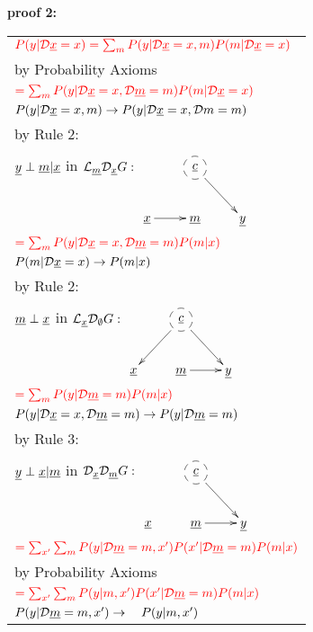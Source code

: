 {\bf * proof 2:}
\begin{longtable}{l}
$\color{red}
P(y|{\cal D}{\underline{x}}=x)=
\sum_m
P(y|{\cal D}{\underline{x}}=x, m)
P(m|{\cal D}{\underline{x}}=x)$
\\
\quad by Probability Axioms
\\
$\color{red}=
\sum_m
P(y|{\cal D}{\underline{x}}=x, {\cal D}{\underline{m}}=m)
P(m|{\cal D}{\underline{x}}=x)$
\\
\quad $P(y|{\cal D}{\underline{x}}=x, m)\rightarrow
P(y|{\cal D}{\underline{x}}=x, {\cal D} m=m)$
\\
\quad by Rule 2: 
\begin{tabular}{l}
\\
\end{tabular}
\\
\quad ${\underline{y}}\perp {\underline{m}}|{\underline{x}}$ in 
${\cal L}_{\underline{m}}{\cal D}_{\underline{x}} G:$
$\xymatrix{
&*++[F-o]{\rvc}\ar[rd]
\\
\rvx\ar[r]
&\rvm
&\rvy
}$
\\
$\color{red}=
\sum_m
P(y|{\cal D}{\underline{x}}=x, {\cal D}{\underline{m}}=m)
P(m| x)$
\\
\quad $P(m|{\cal D}{\underline{x}}=x)\rightarrow P(m|x)$
\\
\quad by Rule 2:
\begin{tabular}{l}
\\
\end{tabular}
\\
\quad 
${\underline{m}}\perp {\underline{x}}$ in
${\cal L}_{\underline{x}}{\cal D}_\emptyset G:$
$\xymatrix{
&*++[F-o]{\rvc}\ar[ld]\ar[rd]
\\
\rvx
&\rvm\ar[r]
&\rvy
}$
\\
$\color{red}=
\sum_m
P(y|{\cal D}{\underline{m}}=m)
P(m|x)$
\\
\quad $P(y|{\cal D}{\underline{x}}=x, {\cal D}{\underline{m}}=m)
\rightarrow
 P(y|{\cal D}{\underline{m}}=m)$
\\
\quad by Rule 3: 
\begin{tabular}{l}
\\
\end{tabular}
\\
\quad
${\underline{y}}\perp{\underline{x}}|{\underline{m}}$ in 
${\cal D}_{\underline{x}}{\cal D}_{\underline{m}} G:$
$\xymatrix{
&*++[F-o]{\rvc}\ar[rd]
\\
\rvx
&\rvm\ar[r]
&\rvy
}$
\\
$\color{red}=
\sum_{x'}
\sum_m
P(y|{\cal D}{\underline{m}}=m, x')
P(x'|{\cal D}{\underline{m}}=m)
P(m|x)$
\\
\quad by Probability Axioms
\\
$\color{red}=
\sum_{x'}
\sum_m
P(y|m, x')
P(x'|{\cal D}{\underline{m}}=m)
P(m|x)$
\\
\quad $P(y|{\cal D}{\underline{m}}=m, x')
\rightarrow
\quad P(y|m, x')$
\\

\end{longtable}

